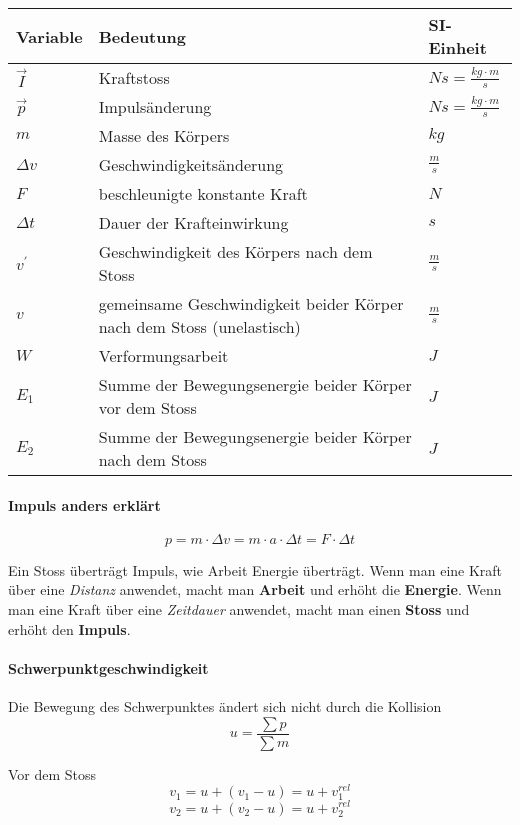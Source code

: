 \begin{tabbing}
	\begin{tabu} to \linewidth {l X l}
		Variable & Bedeutung & SI-Einheit \\
		\midrule
		$\vec{I}$ & Kraftstoss & $Ns = \frac{kg \cdot m}{s}$ \\
		$\vec{p}$ & Impulsänderung & $Ns = \frac{kg \cdot m}{s}$ \\
		$m$ & Masse des Körpers & $kg$ \\
		$\Delta v$ & Geschwindigkeitsänderung & $\frac{m}{s}$  \\
		$F$ & beschleunigte konstante Kraft & $N$ \\
		$\Delta t$ & Dauer der Krafteinwirkung & $s$ \\
		$v^{'}$ & Geschwindigkeit des Körpers nach dem Stoss & $\frac{m}{s}$\\
		$v$ & gemeinsame Geschwindigkeit beider Körper nach dem Stoss (unelastisch) & $\frac{m}{s}$ \\
		$W$ & Verformungsarbeit & $J$\\
		$E_1$ & Summe der Bewegungsenergie beider Körper vor dem Stoss & $J$\\
		$E_2$ & Summe der Bewegungsenergie beider Körper nach dem Stoss & $J$\\
		\bottomrule
	\end{tabu}
\end{tabbing}

\paragraph{Impuls anders erklärt}

$$p = m \cdot \Delta v = m \cdot a \cdot \Delta t = F \cdot \Delta t$$

Ein Stoss überträgt Impuls, wie Arbeit Energie überträgt. Wenn man eine Kraft über eine \textit{Distanz} anwendet, macht man \textbf{Arbeit} und erhöht die \textbf{Energie}. Wenn man eine Kraft über eine \textit{Zeitdauer} anwendet, macht man einen \textbf{Stoss} und erhöht den \textbf{Impuls}.

\paragraph{Schwerpunktgeschwindigkeit}
 Die Bewegung des Schwerpunktes ändert sich nicht durch die Kollision 
 $$  u = \frac{\sum p}{ \sum m} $$

Vor dem Stoss
$$ v_{1} = u + (v_{1} -u) = u + v_{1}^{rel} $$
$$ v_{2} = u + (v_{2} -u) = u + v_{2}^{rel} $$

